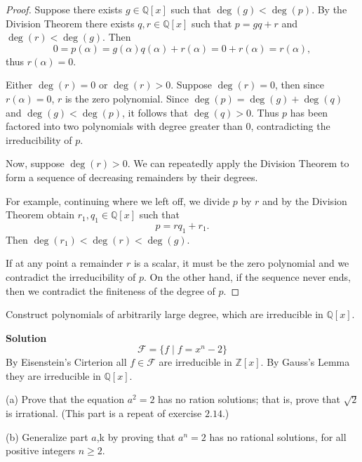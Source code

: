 \begin{proof}
    Suppose there exists $g \in \mathbb{Q}[x]$
        such that $\deg(g) < \deg(p)$.
    By the Division Theorem there exists $q, r \in \mathbb{Q}[x]$
        such that $p = g q + r$ and $\deg(r) < \deg(g)$.
    Then 
    \[0 = p(\alpha) = g(\alpha)q(\alpha) + r(\alpha) = 0 + r(\alpha) = r(\alpha),\]
    thus $r(\alpha) = 0$. 

    Either $\deg(r) = 0$ or $\deg(r) > 0$.
    Suppose $\deg(r) = 0$, then since $r(\alpha) = 0$, $r$ is the zero polynomial.
    Since $\deg(p) = \deg(g) + \deg(q)$ and $\deg(g) < \deg(p)$,
        it follows that $\deg(q) > 0$.
    Thus $p$ has been factored into two polynomials with degree 
        greater than $0$, contradicting the irreducibility of $p$.

    Now, suppose $\deg(r) > 0$. We can repeatedly apply the Division Theorem
        to form a sequence of decreasing remainders by their degrees.

    For example, continuing where we left off, we divide $p$ by $r$
        and by the Division Theorem obtain $r_1, q_1 \in \mathbb{Q}[x]$
        such that 
    \[p = rq_1 + r_1.\]
    Then $\deg(r_1) < \deg(r) < \deg(g)$.

    If at any point a remainder $r$ is a scalar, it must be the 
        zero polynomial and we contradict the irreducibility of $p$.
    On the other hand, if the sequence never ends, then we contradict the finiteness of
        the degree of $p$.
\end{proof}

\begin{tcolorbox}[title=Problem 12, breakable]
    Construct polynomials of arbitrarily large degree,
        which are irreducible in $\mathbb{Q}[x]$.
\end{tcolorbox}

\textbf{Solution}
\[\mathcal{F} = \{f \mid f = x^n - 2\}\]
By Eisenstein's Cirterion all $f \in \mathcal{F}$
    are irreducible in $\mathbb{Z}[x]$.
By Gauss's Lemma they are irreducible in $\mathbb{Q}[x]$.

\begin{tcolorbox}[title=Problem 13, breakable]
    (a) Prove that the equation $a^2 = 2$ has no ration solutions;
        that is, prove that $\sqrt{2}$ is irrational. (This part is a 
        repeat of exercise $2.14$.)

    (b) Generalize part $a$,k by proving that $a^n = 2$ has no rational 
        solutions, for all positive integers $n \ge 2$.
\end{tcolorbox}

